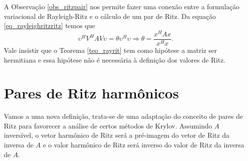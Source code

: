 A Observação \ref{obs_ritzpair} nos permite fazer uma conexão entre a formulação variacional de Rayleigh-Ritz e o cálculo de um par de Ritz. Da equação \eqref{eq_rayleighritzritz} temos que
\[
\upsilon^HV^HAV\upsilon = \theta\upsilon^H\upsilon\Rightarrow \theta=\frac{\displaystyle x^HAx}{\displaystyle x^Hx}.
\]
Vale insistir que o Teorema \ref{teo_rayrit} tem como hip\'{o}tese a matriz ser hermitiana e essa hip\'{o}tese  não é necessária à definição dos valores de Ritz.

\section{Pares de Ritz harmônicos}\label{sec_parritzharm}

Vamos a uma nova definição, trata-se de uma adaptação do conceito de pares de Ritz para favorecer a análise de certos métodos de Krylov. Assumindo $A$ inversível, o vetor harmônico de Ritz será a pré-imagem do vetor de Ritz da inversa de $A$ e o valor harmônico de Ritz será inverso do valor de Ritz da inversa de $A$.

